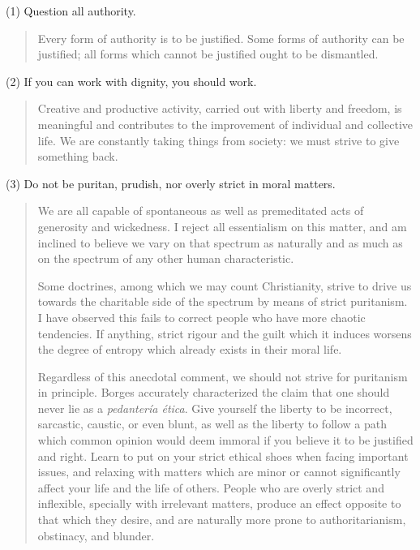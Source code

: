 \documentclass[a4paper, 12pt]{article}
\begin{document}
\normalsize
(1) Question all authority.

\small
\begin{quote}
    Every form of authority is to be justified. Some forms of authority can be 
    justified; all forms which cannot be justified ought to be dismantled. 
\end{quote}

\normalsize
(2) If you can work with dignity, you should work.

\small
\begin{quote}
    Creative and productive activity, carried out with liberty and freedom, is
    meaningful and contributes to the improvement of individual and collective
    life. We are constantly taking things from society: we must strive to give 
    something back. 
\end{quote}

\normalsize
(3) Do not be puritan, prudish, nor overly strict in moral matters.


\small
\begin{quote}

We are all capable of spontaneous as well as premeditated acts of generosity
and wickedness. I reject all essentialism on this matter, and am inclined to
believe we vary on that spectrum as naturally and as much as on the spectrum of any
other human characteristic.

Some doctrines, among which we may count Christianity, strive to drive us towards the 
charitable side of the spectrum by means of strict puritanism. I have observed this fails
to correct people who have more chaotic tendencies. If anything, strict rigour
and the guilt which it induces worsens the degree of entropy which already
exists in their moral life.  

Regardless of this anecdotal comment, we should not strive for puritanism in
principle. Borges accurately characterized the claim that one should never lie
as a \textit{pedantería ética}. Give yourself the liberty to be incorrect,
sarcastic, caustic, or even blunt, as well as the liberty to follow a path
which common opinion would deem immoral if you believe it to be justified and
right. Learn to put on your strict ethical shoes when facing important issues,
and relaxing with matters which are minor or cannot significantly affect your
life and the life of others. People who are overly strict and inflexible,
specially with irrelevant matters, produce an effect opposite to that which
they desire, and are naturally more prone to authoritarianism, obstinacy, and
blunder.

\end{quote}
\normalsize
\end{document}
